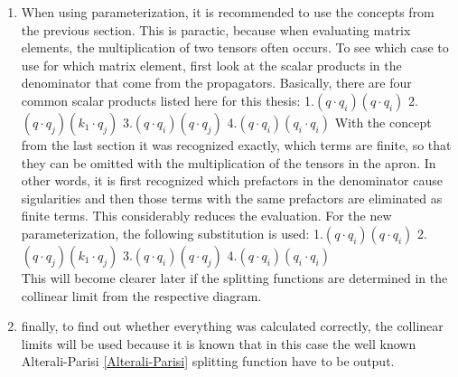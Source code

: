 \begin{enumerate}
\item When using parameterization, it is recommended to use the concepts from the previous section. This is paractic, because when evaluating matrix elements, the multiplication of two tensors often occurs. To see which case to use for which matrix element, first look at the scalar products in the denominator that come from the propagators. Basically, there are four common scalar products listed here for this thesis:
1.$ (q \cdot q_i)(q \cdot q_i) $
2.$ (q \cdot q_j)(k_1 \cdot q_j) $
3.$ (q \cdot q_i)(q \cdot q_j) $
4.$ (q \cdot q_i)(q_i \cdot q_i) $
With the concept from the last section it was recognized exactly, which terms are finite, so that they can be omitted with the multiplication of the tensors in the apron. In other words, it is first recognized which prefactors in the denominator cause sigularities and then those terms with the same prefactors are eliminated as finite terms. This considerably reduces the evaluation.  For the new parameterization, the following substitution is used:
1.$ (q \cdot q_i)(q \cdot q_i) $
2.$ (q \cdot q_j)(k_1 \cdot q_j) $
3.$ (q \cdot q_i)(q \cdot q_j) $
4.$ (q \cdot q_i)(q_i \cdot q_i) $
\\
This will become clearer later if the splitting functions are determined in the collinear limit from the respective diagram.
\item finally, to find out whether everything was calculated correctly, the collinear limits will be used because it is known that in this case the well known Alterali-Parisi \ref{Alterali-Parisi} splitting function have to be output.
\end{enumerate}
